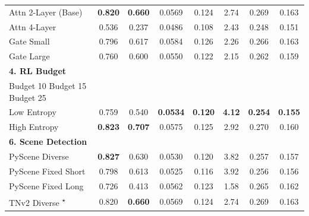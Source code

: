 \begin{table}[t]
\begin{tabular}{@{} l c c c c c c c @{}}
\hspace{3mm} Attn 2-Layer (Base) & \textbf{0.820} & \textbf{0.660} & 0.0569 & 0.124 & 2.74 & 0.269 & 0.163 \\
\hspace{3mm} Attn 4-Layer & 0.536 & 0.237 & 0.0486 & 0.108 & 2.43 & 0.248 & 0.151 \\
\hspace{3mm} Gate Small & 0.796 & 0.617 & 0.0584 & 0.126 & 2.26 & 0.266 & 0.163 \\
\hspace{3mm} Gate Large & 0.760 & 0.600 & 0.0550 & 0.122 & 2.15 & 0.262 & 0.159 \\
\midrule
\multicolumn{8}{l}{\textbf{4. RL Budget}} \\
\hspace{3mm} Budget 10%
\hspace{3mm} Budget 15%
\hspace{3mm} Budget 25%
\midrule
\multicolumn{8}{l}{\textbf{5. Entropy Reg.}} \\
\hspace{3mm} Low Entropy & 0.759 & 0.540 & \textbf{0.0534} & \textbf{0.120} & \textbf{4.12} & \textbf{0.254} & \textbf{0.155} \\
\hspace{3mm} High Entropy & \textbf{0.823} & \textbf{0.707} & 0.0575 & 0.125 & 2.92 & 0.270 & 0.160 \\
\midrule
\multicolumn{8}{l}{\textbf{6. Scene Detection}} \\
\hspace{3mm} PyScene Diverse & \textbf{0.827} & 0.630 & 0.0530 & 0.120 & 3.82 & 0.257 & 0.157 \\
\hspace{3mm} PyScene Fixed Short & 0.798 & 0.613 & 0.0525 & 0.116 & 3.92 & 0.256 & 0.156 \\
\hspace{3mm} PyScene Fixed Long & 0.726 & 0.413 & 0.0562 & 0.123 & 1.58 & 0.265 & 0.162 \\
\rowcolor{gray!15} \hspace{3mm} TNv2 Diverse \textsuperscript{$\star$} & 0.820 & \textbf{0.660} & 0.0569 & 0.124 & 2.74 & 0.269 & 0.163 \\

\end{tabular}
\end{table}
